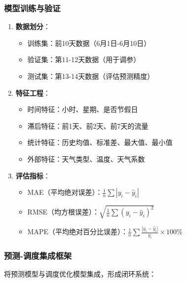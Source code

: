 \documentclass[12pt,a4paper]{ctexart}
\begin{document}
\subsubsection{模型训练与验证}

\begin{enumerate}
    \item \textbf{数据划分}：
    \begin{itemize}
        \item 训练集：前10天数据（6月1日-6月10日）
        \item 验证集：第11-12天数据（用于调参）
        \item 测试集：第13-14天数据（评估预测精度）
    \end{itemize}

    \item \textbf{特征工程}：
    \begin{itemize}
        \item 时间特征：小时、星期、是否节假日
        \item 滞后特征：前1天、前2天、前7天的流量
        \item 统计特征：历史均值、标准差、最大值、最小值
        \item 外部特征：天气类型、温度、天气系数
    \end{itemize}

    \item \textbf{评估指标}：
    \begin{itemize}
        \item MAE（平均绝对误差）：$\frac{1}{n}\sum |y_i - \hat{y}_i|$
        \item RMSE（均方根误差）：$\sqrt{\frac{1}{n}\sum (y_i - \hat{y}_i)^2}$
        \item MAPE（平均绝对百分比误差）：$\frac{1}{n}\sum \frac{|y_i - \hat{y}_i|}{y_i} \times 100\%$
    \end{itemize}
\end{enumerate}

\subsubsection{预测-调度集成框架}

将预测模型与调度优化模型集成，形成闭环系统：
\end{document}
